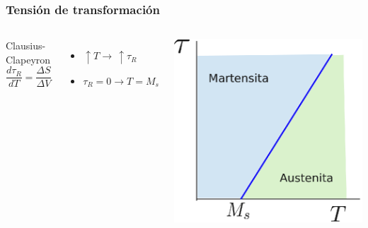 \documentclass[usenames,dvipsnames]{beamer}
\begin{document}
\begin{frame}
\frametitle{Tensión de transformación}

\begin{columns}

\begin{block}{Clausius-Clapeyron}
\begin{equation*}
 \frac{d \tau_{R}}{dT}=\frac{\Delta S}{\Delta V} 
\end{equation*}
\end{block}

\begin{itemize}
 \item $\uparrow T \rightarrow \, \uparrow \tau_{R}$
 \item $\tau_{R} = 0  \rightarrow T=M_{s}$
\end{itemize}

\includegraphics[width=\columnwidth]{img/intro/Clapeyron.eps}

\end{columns}


\end{frame}
\end{document}
